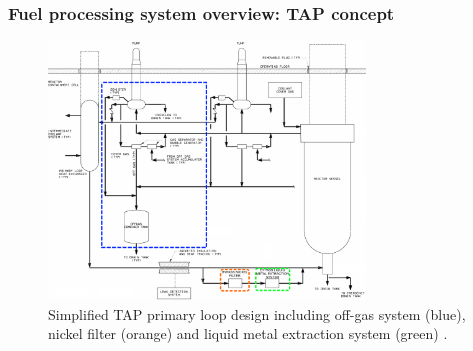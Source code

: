 \begin{frame}
\frametitle{Fuel processing system overview: TAP concept}
	\vspace{-2mm}
\begin{figure}[htp!] %
	\centering
	\includegraphics[width=0.75\textwidth]{../dissertation/figures/ch4/tap_primary_loop.png}
		\vspace{-2mm}
	\caption{Simplified \gls{TAP} primary loop design including off-gas system 
		(blue), nickel filter (orange) and liquid metal extraction system 
		(green) \cite{transatomic_power_transatomic_2019}.}
\end{figure}

\end{frame}

